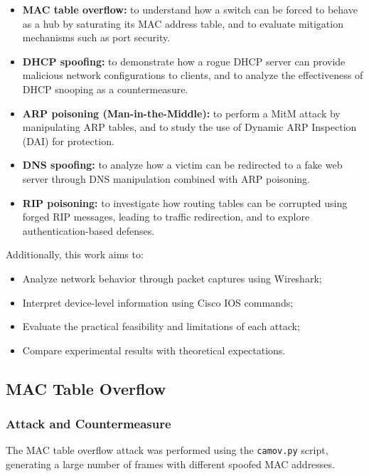 \documentclass[12pt]{article}
\begin{document}
\begin{itemize}
    \item \textbf{MAC table overflow:} to understand how a switch can be forced to behave as a hub by saturating its MAC address table, and to evaluate mitigation mechanisms such as port security.
    
    \item \textbf{DHCP spoofing:} to demonstrate how a rogue DHCP server can provide malicious network configurations to clients, and to analyze the effectiveness of DHCP snooping as a countermeasure.
    
    \item \textbf{ARP poisoning (Man-in-the-Middle):} to perform a MitM attack by manipulating ARP tables, and to study the use of Dynamic ARP Inspection (DAI) for protection.
    
    \item \textbf{DNS spoofing:} to analyze how a victim can be redirected to a fake web server through DNS manipulation combined with ARP poisoning.
    
    \item \textbf{RIP poisoning:} to investigate how routing tables can be corrupted using forged RIP messages, leading to traffic redirection, and to explore authentication-based defenses.
\end{itemize}

Additionally, this work aims to:

\begin{itemize}
    \item Analyze network behavior through packet captures using Wireshark;
    \item Interpret device-level information using Cisco IOS commands;
    \item Evaluate the practical feasibility and limitations of each attack;
    \item Compare experimental results with theoretical expectations.
\end{itemize}

\newpage

\subsection{MAC Table Overflow}

\subsubsection{Attack and Countermeasure}  
The MAC table overflow attack was performed using the \texttt{camov.py} script, generating a large number of frames with different spoofed MAC addresses.  
\end{document}
